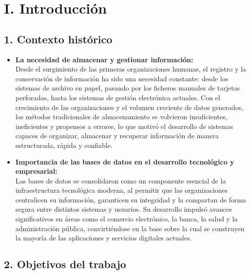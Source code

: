\documentclass[12pt,a4paper]{article}
\begin{document}
\section*{I. Introducción}

\subsection*{1. Contexto histórico}

\begin{itemize}
  \item \textbf{La necesidad de almacenar y gestionar información:} \\
  Desde el surgimiento de las primeras organizaciones humanas, el registro y la conservación de información ha sido una necesidad constante: desde los sistemas de archivo en papel, pasando por los ficheros manuales de tarjetas perforadas, hasta los sistemas de gestión electrónica actuales. Con el crecimiento de las organizaciones y el volumen creciente de datos generados, los métodos tradicionales de almacenamiento se volvieron insuficientes, ineficientes y propensos a errores, lo que motivó el desarrollo de sistemas capaces de organizar, almacenar y recuperar información de manera estructurada, rápida y confiable.

  \item \textbf{Importancia de las bases de datos en el desarrollo tecnológico y empresarial:} \\
  Las bases de datos se consolidaron como un componente esencial de la infraestructura tecnológica moderna, al permitir que las organizaciones centralicen su información, garanticen su integridad y la compartan de forma segura entre distintos sistemas y usuarios. Su desarrollo impulsó avances significativos en áreas como el comercio electrónico, la banca, la salud y la administración pública, convirtiéndose en la base sobre la cual se construyen la mayoría de las aplicaciones y servicios digitales actuales.
\end{itemize}

\subsection*{2. Objetivos del trabajo}
\end{document}
